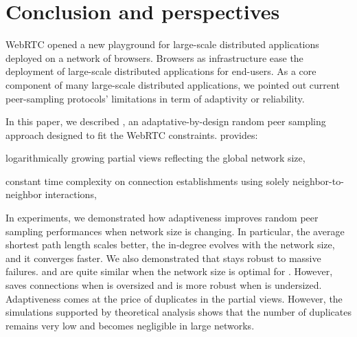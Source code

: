
\section{Conclusion and perspectives}
\label{sec:conclusion}


WebRTC opened a new playground for large-scale distributed applications
deployed on a network of browsers. Browsers as infrastructure ease the
deployment of large-scale distributed applications for end-users. As a core
component of many large-scale distributed applications, we pointed out current
peer-sampling protocols' limitations in term of adaptivity or reliability.

In this paper, we described \SPRAY, an adaptative-by-design random peer
sampling approach designed to fit the WebRTC constraints.  \SPRAY provides:
\begin{inparaenum}[(i)]
\item logarithmically growing partial views reflecting the global network size,
\item constant time complexity on connection establishments using solely
  neighbor-to-neighbor interactions,
\end{inparaenum}

In experiments, we demonstrated how \SPRAY adaptiveness improves random peer
sampling performances when network size is changing. In particular, the average
shortest path length scales better, the in-degree evolves with the network
size, and it converges faster.  We also demonstrated that \SPRAY stays robust
to massive failures. \SPRAY and \CYCLON are quite similar when the network size
is optimal for \CYCLON. However, \SPRAY saves connections when \CYCLON is
oversized and is more robust when \CYCLON is undersized. Adaptiveness comes at
the price of duplicates in the partial views. However, the simulations
supported by theoretical analysis shows that the number of duplicates remains
very low and becomes negligible in large networks.




